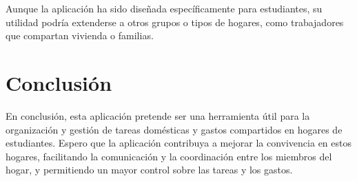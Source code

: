 \documentclass{article}
\begin{document}
Aunque la aplicación ha sido diseñada específicamente para estudiantes, su utilidad podría extenderse a otros grupos o tipos de hogares, 
como trabajadores que compartan vivienda o familias. 

\section{Conclusión}
 
En conclusión, esta aplicación pretende ser una herramienta útil para la organización y gestión de tareas domésticas 
y gastos compartidos en hogares de estudiantes. Espero que la aplicación contribuya a mejorar la convivencia en estos hogares, 
facilitando la comunicación y la coordinación entre los miembros del hogar, y permitiendo un mayor control sobre las tareas y los gastos.
\end{document}
